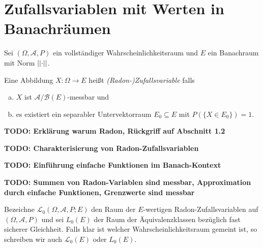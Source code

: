 \section{Zufallsvariablen mit Werten in Banachräumen}
Sei $(\Omega, \mathcal{A}, P)$ ein vollständiger Wahrscheinlichkeitsraum und $E$ ein Banachraum mit Norm $\lvert \lvert \cdot \rvert \rvert$. 
\begin{mydef}
    Eine Abbildung $X: \Omega \to E$ heißt \textit{(Radon-)Zufallsvariable} falls 
    \begin{enumerate}[(a)]
        \item $X$ ist $\mathcal{A}/\mathcal{B}(E)$-messbar und
        \item es existiert ein separabler Untervektorraum $E_0 \subseteq E$ mit $P(\{X \in E_0\}) = 1$. 
    \end{enumerate}
\end{mydef}
\textbf{TODO: Erklärung warum Radon, Rückgriff auf Abschnitt 1.2}
\begin{proposition}
    \textbf{TODO: Charakterisierung von Radon-Zufallsvariablen}
\end{proposition}
\textbf{TODO: Einführung einfache Funktionen im Banach-Kontext}
\begin{proposition}
    \textbf{TODO: Summen von Radon-Variablen sind messbar, Approximation durch einfache Funktionen, Grenzwerte sind messbar}
\end{proposition}

Bezeichne $\mathcal{L}_0(\Omega, \mathcal{A}, P; E)$ den Raum der $E$-wertigen Radon-Zufallsvariablen auf $(\Omega,\mathcal{A},P)$ und sei $L_0(E)$ der Raum der Äquivalenzklassen bezüglich fast sicherer Gleichheit. 
Falls klar ist welcher Wahrscheinlichkeitsraum gemeint ist, so schreiben wir auch $\mathcal{L}_0(E)$ oder $L_0(E)$. 

